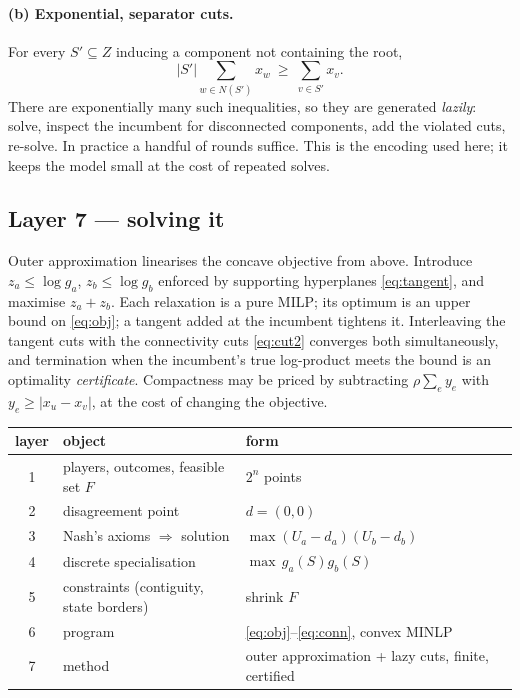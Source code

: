 \documentclass[11pt]{article}
\theoremstyle{remark}\newtheorem*{remark}{Remark}
\begin{document}
\paragraph{(b) Exponential, separator cuts.} For every $S'\subseteq Z$ inducing a
component not containing the root,
\begin{equation}\label{eq:cut2}
|S'|\sum_{w\in N(S')}x_w\ \ge\ \sum_{v\in S'}x_v .
\end{equation}
There are exponentially many such inequalities, so they are generated \emph{lazily}: solve,
inspect the incumbent for disconnected components, add the violated cuts, re-solve. In
practice a handful of rounds suffice. This is the encoding used here; it keeps the model
small at the cost of repeated solves.

\subsection{Layer 7 --- solving it}
Outer approximation linearises the concave objective from above. Introduce
$z_a\le\log g_a$, $z_b\le\log g_b$ enforced by supporting hyperplanes \eqref{eq:tangent},
and maximise $z_a+z_b$. Each relaxation is a pure MILP; its optimum is an upper bound on
\eqref{eq:obj}; a tangent added at the incumbent tightens it. Interleaving the tangent
cuts with the connectivity cuts \eqref{eq:cut2} converges both simultaneously, and
termination when the incumbent's true log-product meets the bound is an optimality
\emph{certificate}. Compactness may be priced by subtracting
$\rho\sum_{e}y_e$ with $y_e\ge|x_u-x_v|$, at the cost of changing the objective.

\begin{center}
\begin{tabular}{clll}
\toprule
\textbf{layer} & \textbf{object} & \textbf{form}\\
\midrule
1 & players, outcomes, feasible set $F$ & $2^n$ points\\
2 & disagreement point & $d=(0,0)$\\
3 & Nash's axioms $\Rightarrow$ solution & $\max(U_a-d_a)(U_b-d_b)$\\
4 & discrete specialisation & $\max\,g_a(S)g_b(S)$\\
5 & constraints (contiguity, state borders) & shrink $F$\\
6 & program & \eqref{eq:obj}--\eqref{eq:conn}, convex MINLP\\
7 & method & outer approximation + lazy cuts, finite, certified\\
\bottomrule
\end{tabular}
\end{center}
\end{document}
